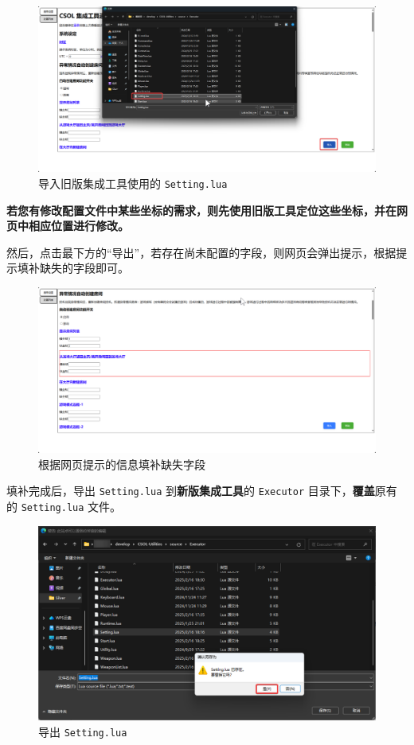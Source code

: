 \begin{figure}[H]
    \Centering
    \includegraphics[width=\textwidth]{documents/assets/import_setting}
    \caption{导入旧版集成工具使用的 \lstinline{Setting.lua}}
\end{figure}

\textbf{\color{red}若您有修改配置文件中某些坐标的需求，则先使用旧版工具定位这些坐标，并在网页中相应位置进行修改。}

然后，点击最下方的“导出”，若存在尚未配置的字段，则网页会弹出提示，根据提示填补缺失的字段即可。

\begin{figure}[H]
    \Centering
    \includegraphics[width=\textwidth]{documents/assets/export_error}
    \caption{根据网页提示的信息填补缺失字段}
\end{figure}

填补完成后，导出 \lstinline{Setting.lua} 到\textbf{\color{red}新版集成工具}的 \lstinline{Executor} 目录下，\textbf{\color{red}覆盖}原有的 \lstinline{Setting.lua} 文件。

\begin{figure}[H]
    \Centering
    \includegraphics[width=\textwidth]{documents/assets/override_setting}
    \caption{导出 \lstinline{Setting.lua}}
\end{figure}

